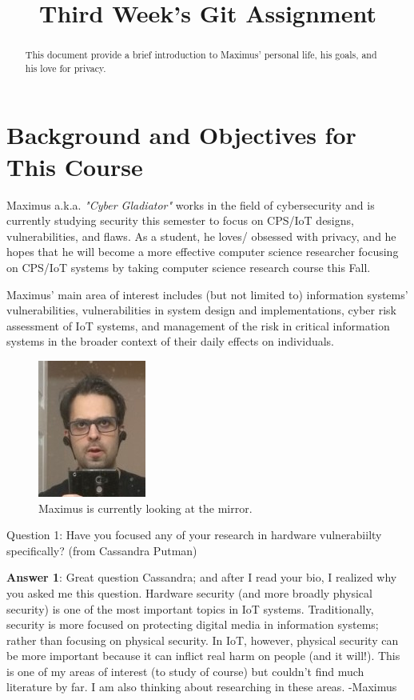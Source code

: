 


 \title{Third Week's Git Assignment} 

 \maketitle


\begin{abstract}
This document provide a brief introduction to Maximus' personal life, his goals, and his love for privacy.
\end{abstract}
\section{Background and Objectives for This Course}
Maximus a.k.a. \emph{"Cyber Gladiator"} works in the field of cybersecurity and is currently studying security this semester to focus on CPS/IoT designs, vulnerabilities, and flaws. As a student, he loves/ obsessed with privacy, and he hopes that he will become a more effective computer science researcher focusing on CPS/IoT systems by taking computer science research course this Fall.

Maximus' main area of interest includes (but not limited to) information systems’ vulnerabilities, vulnerabilities in system design and implementations, cyber risk assessment of IoT systems, and management of the risk in critical information systems in the broader context of their daily effects on individuals.


\begin{figure}[htbp]
\centerline{\includegraphics{a481.jpg}}
\caption{Maximus is currently looking at the mirror.}
\label{fig}
\end{figure}

Question 1: Have you focused any of your research in hardware vulnerabiilty specifically?  (from Cassandra Putman)  


\textbf{Answer 1}: Great question Cassandra; and after I read your bio, I realized why you asked me this question.  Hardware security (and more broadly physical security) is one of the most important topics in IoT systems. Traditionally, security is more focused on protecting digital media in information systems; rather than focusing on physical security. In IoT, however, physical security can be more important because it can inflict real harm on people (and it will!). This is one of my areas of interest (to study of course) but couldn't find much literature by far. I am also thinking about researching in these areas. -Maximus

